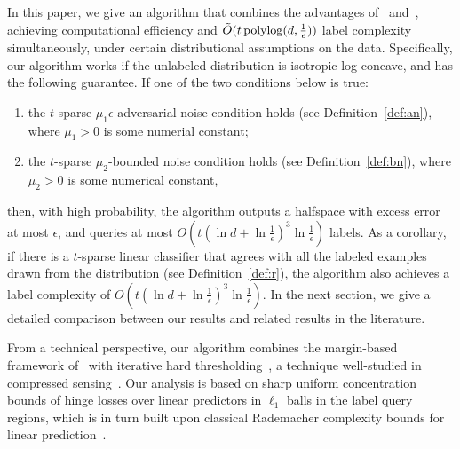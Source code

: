 
In this paper, we give an algorithm that combines the advantages of~\cite{ZC14} and~\cite{ABHZ16}, achieving computational efficiency and $\tilde{O}(t \operatorname{polylog}(d, \frac 1 \epsilon))$ label complexity simultaneously, under certain distributional assumptions on the data.
Specifically, our algorithm works if the unlabeled distribution is isotropic log-concave, and has the following guarantee.
If one of the two conditions below is true:
\begin{enumerate}
\item the $t$-sparse $\mu_1\epsilon$-adversarial noise condition holds (see Definition~\ref{def:an}), where $\mu_1 > 0$ is some numerial constant;

\item the $t$-sparse $\mu_2$-bounded noise condition holds (see Definition~\ref{def:bn}), where $\mu_2 > 0$ is some numerical constant,

\end{enumerate}
then, with high probability, the algorithm outputs a halfspace with excess error at most $\epsilon$, and queries at most $O(t (\ln d + \ln \frac 1 \epsilon)^3 \ln \frac 1 \epsilon )$ labels. As a corollary, if there is a $t$-sparse linear classifier that
agrees with all the labeled examples drawn from the distribution (see Definition~\ref{def:r}), the algorithm also achieves a label complexity of $O(t (\ln d + \ln \frac 1 \epsilon)^3 \ln \frac 1 \epsilon )$. In the next section, we give a detailed comparison between
our results and related results in the literature.

From a technical perspective, our algorithm combines the margin-based
framework of~\cite{BBZ07, BL13} with iterative hard thresholding~\citep{BD09, GK09}, a technique well-studied in compressed sensing~\citep{CT06,D06}. Our analysis is based on sharp uniform concentration bounds of hinge losses over linear predictors in $\ell_1$ balls in the label query regions, which is in turn built upon classical Rademacher complexity bounds for linear prediction~\citep{KST09}.



